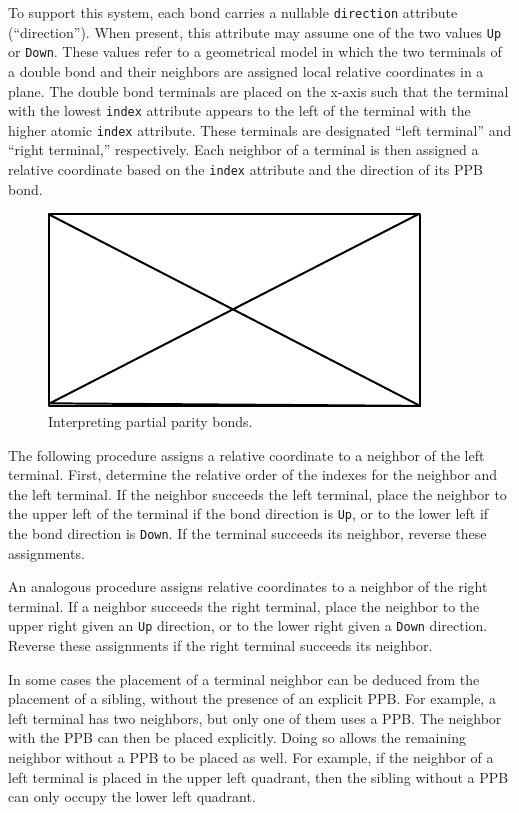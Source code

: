 \documentclass{article}
\def\ttt{\texttt}
\begin{document}
To support this system, each bond carries a nullable \ttt{direction} attribute (\enquote{direction}). When present, this attribute may assume one of the two values \ttt{Up} or \ttt{Down}. These values refer to a geometrical model in which the two terminals of a double bond and their neighbors are assigned local relative coordinates in a plane. The double bond terminals are placed on the x-axis such that the terminal with the lowest \ttt{index} attribute appears to the left of the terminal with the higher atomic \ttt{index} attribute. These terminals are designated \enquote{left terminal} and \enquote{right terminal,} respectively. Each neighbor of a terminal is then assigned a relative coordinate based on the \ttt{index} attribute and the direction of its PPB bond.

\begin{figure}
    \centering
    \includegraphics{filler}
    \caption{Interpreting partial parity bonds.}
    \label{fig:interpret-ppb}
\end{figure}

The following procedure assigns a relative coordinate to a neighbor of the left terminal. First, determine the relative order of the indexes for the neighbor and the left terminal. If the neighbor succeeds the left terminal, place the neighbor to the upper left of the terminal if the bond direction is \ttt{Up}, or to the lower left if the bond direction is \ttt{Down}. If the terminal succeeds its neighbor, reverse these assignments.

An analogous procedure assigns relative coordinates to a neighbor of the right terminal. If a neighbor succeeds the right terminal, place the neighbor to the upper right given an \ttt{Up} direction, or to the lower right given a \ttt{Down} direction. Reverse these assignments if the right terminal succeeds its neighbor.

In some cases the placement of a terminal neighbor can be deduced from the placement of a sibling, without the presence of an explicit PPB. For example, a left terminal has two neighbors, but only one of them uses a PPB. The neighbor with the PPB can then be placed explicitly. Doing so allows the remaining neighbor without a PPB to be placed as well. For example, if the neighbor of a left terminal is placed in the upper left quadrant, then the sibling without a PPB can only occupy the lower left quadrant.
\end{document}

